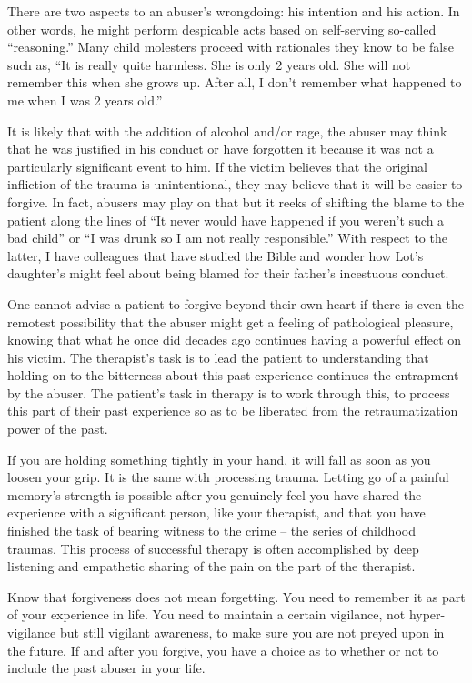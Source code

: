 \documentclass[]{book}
\begin{document}
There are two aspects to an abuser's wrongdoing: his intention and his action. In other words, he might perform despicable acts based on self-serving so-called ``reasoning.'' Many child molesters proceed with rationales they know to be false such as, ``It is really quite harmless. She is only 2 years old. She will not remember this when she grows up. After all, I don't remember what happened to me when I was 2 years old.''

It is likely that with the addition of alcohol and/or rage, the abuser may think that he was justified in his conduct or have forgotten it because it was not a particularly significant event to him. If the victim believes that the original infliction of the trauma is unintentional, they may believe that it will be easier to forgive. In fact, abusers may play on that but it reeks of shifting the blame to the patient along the lines of ``It never would have happened if you weren't such a bad child'' or ``I was drunk so I am not really responsible.'' With respect to the latter, I have colleagues that have studied the Bible and wonder how Lot's daughter's might feel about being blamed for their father's incestuous conduct.

One cannot advise a patient to forgive beyond their own heart if there is even the remotest possibility that the abuser might get a feeling of pathological pleasure, knowing that what he once did decades ago continues having a powerful effect on his victim. The therapist's task is to lead the patient to understanding that holding on to the bitterness about this past experience continues the entrapment by the abuser. The patient's task in therapy is to work through this, to process this part of their past experience so as to be liberated from the retraumatization power of the past.

If you are holding something tightly in your hand, it will fall as soon as you loosen your grip. It is the same with processing trauma. Letting go of a painful memory's strength is possible after you genuinely feel you have shared the experience with a significant person, like your therapist, and that you have finished the task of bearing witness to the crime -- the series of childhood traumas. This process of successful therapy is often accomplished by deep listening and empathetic sharing of the pain on the part of the therapist.

Know that forgiveness does not mean forgetting. You need to remember it as part of your experience in life. You need to maintain a certain vigilance, not hyper-vigilance but still vigilant awareness, to make sure you are not preyed upon in the future. If and after you forgive, you have a choice as to whether or not to include the past abuser in your life.
\end{document}
